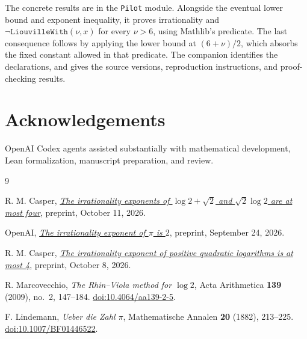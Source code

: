 \documentclass[11pt]{article}
\theoremstyle{remark}
\begin{document}
The concrete results are in the \texttt{Pilot} module. Alongside the
eventual lower bound and exponent inequality, it proves irrationality
and $\neg\texttt{LiouvilleWith}(\nu,x)$ for every $\nu>6$, using
Mathlib's predicate. The last consequence follows by applying the
lower bound at $(6+\nu)/2$, which absorbs the fixed constant allowed
in that predicate. The companion  identifies
the declarations, and  gives the source versions,
reproduction instructions, and proof-checking results.

\section*{Acknowledgements}
OpenAI Codex agents assisted substantially with mathematical development, Lean
formalization, manuscript preparation, and review.

\begin{thebibliography}{9}
\raggedright
{}
R. M. Casper,
\emph{\href{https://github.com/Mattie/math/blob/cf1338bcee8fe9f08422ec36e8fdf6dc6392c677/preprints/The-irrationality-exponents-of-log-2-plus-sqrt2-and-sqrt2-log-2-are-at-most-4-October-11-2026/paper.pdf}{The irrationality exponents of $\log2+\sqrt2$
and $\sqrt2\log2$ are at most four}}, preprint, October 11, 2026.

OpenAI,
\emph{\href{https://github.com/openai/math/tree/adc7f1241b42e322a6451854ab7e4b4c146bf78a/preprints/The-irrationality-exponent-of-pi-is-2-September-24-2026}{The irrationality exponent of $\pi$ is $2$}},
preprint, September 24, 2026.

R. M. Casper,
\emph{\href{https://github.com/Mattie/math/tree/4aa817179b5a81358dcdefeb1d454a31ab2f2c27/preprints/The-irrationality-exponent-of-positive-quadratic-logarithms-is-at-most-4-October-8-2026}{The irrationality exponent of positive quadratic
logarithms is at most 4}}, preprint, October 8, 2026.

R. Marcovecchio, \emph{The Rhin--Viola method for $\log2$},
Acta Arithmetica \textbf{139} (2009), no.~2, 147--184.
\href{https://doi.org/10.4064/aa139-2-5}{doi:10.4064/aa139-2-5}.

F. Lindemann, \emph{Ueber die Zahl $\pi$}, Mathematische Annalen
\textbf{20} (1882), 213--225.
\href{https://doi.org/10.1007/BF01446522}{doi:10.1007/BF01446522}.
\end{thebibliography}
\end{document}
